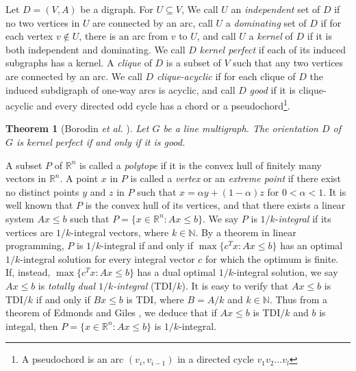 \documentclass[11pt]{article}
\newtheorem{theorem}{Theorem}%
\numberwithin{theorem}{section}
\begin{document}
Let $D=(V,A)$ be a digraph. 
For $U\subseteq V$, We call $U$ an \textit{independent} set of $D$ if no two vertices in $U$ are connected by an arc, call $U$ a \textit{dominating} set of $D$ if for each vertex $v\not\in U$, there is an arc from $v$ to $U$, and call $U$ a \textit{kernel} of $D$ if it is both independent and dominating. 
We call $D$ \textit{kernel perfect} if each of its induced subgraphs has a kernel.
A \textit{clique} of $D$ is a subset of $V$ such that any two vertices are connected by an arc. We call $D$ \textit{clique-acyclic} if for each clique of $D$ the induced subdigraph of one-way arcs is acyclic, and call $D$ \textit{good} if it is clique-acyclic and every directed odd cycle has a chord or a pseudochord\footnote{A pseudochord is an arc $(v_i,v_{i-1})$ in a directed cycle $v_1 v_2\ldots v_l$}. 

\begin{theorem}[Borodin \textit{et al.} \cite{BoroKost98}]
\label{thm:BoroKost98}
Let $G$ be a line multigraph. The orientation $D$ of $G$ is kernel perfect if and only if it is good.
\end{theorem}

A subset $P$ of $\mathbb{R}^n$ is called a \textit{polytope} if it is the convex hull of finitely many vectors in $\mathbb{R}^n$. A point $x$ in $P$ is called a \textit{vertex} or an \textit{extreme point} if there exist no distinct points $y$ and $z$ in $P$ such that $x=\alpha y+ (1-\alpha)z$ for $0<\alpha<1$. It is well known that $P$ is the convex hull of its vertices, and that there exists a linear system $Ax\leq b$ such that $P=\{x\in\mathbb{R}^n:Ax\leq b\}$. We say $P$ is $1/k$-\textit{integral} if its vertices are $1/k$-integral vectors, where $k\in\mathbb{N}$. By a theorem in linear programming, $P$ is $1/k$-integral if and only if $\max\{c^T x:Ax\leq b\}$ has an optimal $1/k$-integral solution for every integral vector $c$ for which the optimum is finite. If, instead, $\max\{c^T x:Ax\leq b\}$ has a dual optimal $1/k$-integral solution, we say $Ax\leq b$ is \textit{totally dual $1/k$-integral} (TDI$/k$).
It is easy to verify that $Ax\leq b$ is TDI$/k$ if and only if $Bx\leq b$ is TDI, where $B=A/k$ and $k\in\mathbb{N}$. Thus from a theorem of Edmonds and Giles \cite{EdmoGile77}, we deduce that if $Ax\leq b$ is TDI$/k$ and $b$ is integal, then $P=\{x\in\mathbb{R}^n:Ax\leq b\}$ is $1/k$-integral.
\end{document}
